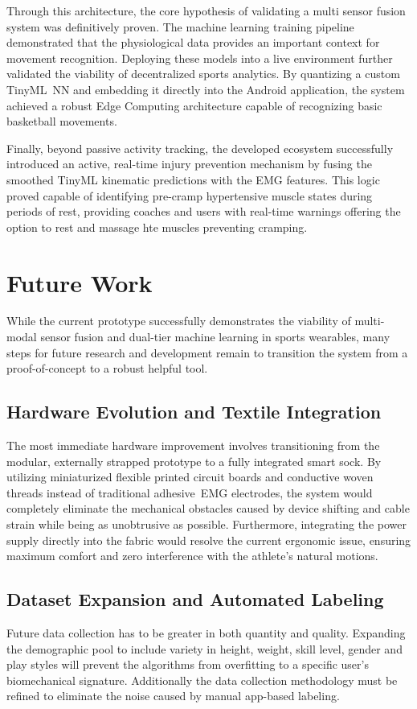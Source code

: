 Through this architecture, the core hypothesis of validating a multi sensor fusion system was definitively proven. The machine learning training pipeline demonstrated that
the physiological data provides an important context for movement recognition. 
Deploying these models into a live environment further validated the viability of decentralized sports analytics. By quantizing a custom Tiny\gls{ML}~\gls{NN} and embedding it directly into the Android application, 
the system achieved a robust Edge Computing architecture capable of recognizing basic basketball movements. 

Finally, beyond passive activity tracking, the developed ecosystem successfully introduced an active, real-time injury prevention mechanism by fusing the smoothed Tiny\gls{ML} kinematic predictions with the \gls{EMG} 
features. This logic proved capable of identifying pre-cramp hypertensive muscle states during periods of rest, providing coaches and users with real-time warnings offering the option to rest and massage hte muscles 
preventing cramping.


\section{Future Work}
\label{sec:future} 

While the current prototype successfully demonstrates the viability of multi-modal sensor fusion and dual-tier machine learning in sports wearables, many steps for future research and development remain to 
transition the system from a proof-of-concept to a robust helpful tool.

\subsection{Hardware Evolution and Textile Integration}
\label{sec:future_hardware} 
The most immediate hardware improvement involves transitioning from the modular, externally strapped prototype to a fully integrated smart sock. By utilizing miniaturized flexible printed circuit boards and conductive 
woven threads instead of traditional adhesive~\gls{EMG} electrodes, the system would completely eliminate the mechanical obstacles caused by device shifting and cable strain while being as unobtrusive as possible. 
Furthermore, integrating the power supply directly into the fabric would resolve the current ergonomic issue, ensuring maximum comfort and zero interference with the athlete's natural motions.

\subsection{Dataset Expansion and Automated Labeling}
\label{sec:future_data}
Future data collection has to be greater in both quantity and quality. Expanding the demographic pool to include variety in height, weight, skill level, gender and play styles will prevent the algorithms from overfitting 
to a specific user's biomechanical signature. Additionally the data collection methodology must be refined to eliminate the noise caused by manual app-based labeling.


